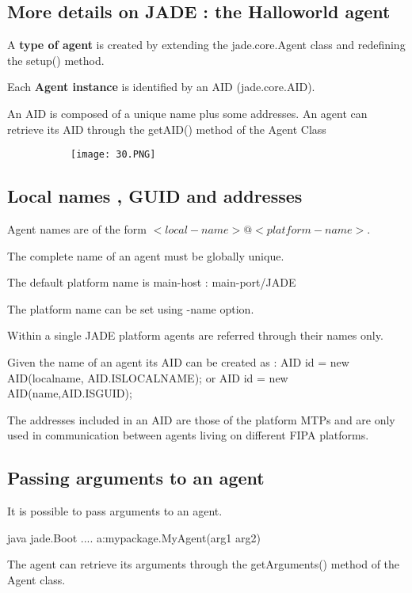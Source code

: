 \documentclass{article}
\begin{document}
\subsection{More details on JADE : the Halloworld agent}

A \textbf{type of agent} is created by extending the jade.core.Agent class and redefining the setup() method.

Each \textbf{Agent instance} is identified by an AID (jade.core.AID).

An AID is composed of a unique name plus some addresses. An agent can retrieve its AID through the getAID() method of the Agent Class

\begin{figure}[ht!]
  \centering
  \begin{subfigure}[b]{0.6\linewidth}
    \texttt{[image: 30.PNG]}
  \end{subfigure}
\end{figure}

\subsection{Local names , GUID and addresses}

Agent names are of the form \textbf{$<local-name>@<platform-name>.$}

The complete name of an agent must be globally unique.

The default platform name is main-host : main-port/JADE

The platform name can be set using -name option.

Within a single JADE platform agents are referred through their names only.

Given the name of an agent its AID can be created as : AID id = new AID(localname, AID.ISLOCALNAME); or AID id = new AID(name,AID.ISGUID);

The addresses included in an AID are those of the platform MTPs and are only used in communication between agents living on different FIPA platforms.

\subsection{Passing arguments to an agent}

It is possible to pass arguments to an agent.

java jade.Boot .... a:mypackage.MyAgent(arg1 arg2)

The agent can retrieve its arguments through the getArguments() method of the Agent class.
\end{document}

